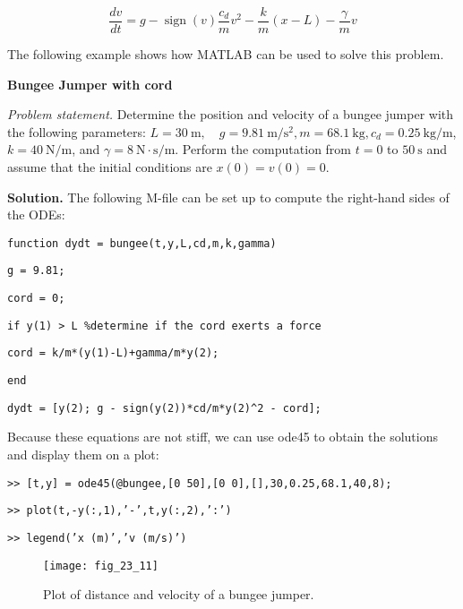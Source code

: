 \documentclass[../main.tex]{subfiles}
\begin{document}
\begin{equation}
    \tag{23.27b}
    \frac{d v}{d t}=g-\operatorname{sign}(v) \frac{c_{d}}{m} v^{2}-\frac{k}{m}(x-L)-\frac{\gamma}{m} v
\end{equation}

\noindent The following example shows how MATLAB can be used to solve this problem.

\begin{exmp}
    \textbf{Bungee Jumper with cord}

    \noindent \textit{Problem statement.} Determine the position and velocity of a bungee jumper with the following parameters: $L=30 \mathrm{~m}, \quad g=9.81 \mathrm{~m} / \mathrm{s}^{2}, m=68.1 \mathrm{~kg}, c_{d}=0.25 \mathrm{~kg} / \mathrm{m}$, $k=40 \mathrm{~N} / \mathrm{m}$, and $\gamma=8 \mathrm{~N} \cdot \mathrm{s} / \mathrm{m}$. Perform the computation from $t=0$ to $50 \mathrm{~s}$ and assume that the initial conditions are $x(0)=v(0)=0$.

    \noindent \textbf{Solution.} The following M-file can be set up to compute the right-hand sides of the ODEs: %

    \noindent \texttt{function dydt = bungee(t,y,L,cd,m,k,gamma)}

    \noindent \texttt{g = 9.81;}
    
    \noindent \texttt{cord = 0;}

    \noindent \texttt{if y(1) > L \%determine if the cord exerts a force}

    \texttt{cord = k/m*(y(1)-L)+gamma/m*y(2);}

    \noindent \texttt{end}

    \noindent \texttt{dydt = [y(2); g - sign(y(2))*cd/m*y(2)\^{}2 - cord];}

    Because these equations are not stiff, we can use ode45 to obtain the solutions and display them on a plot:

    \noindent \texttt{>> [t,y] = ode45(@bungee,[0 50],[0 0],[],30,0.25,68.1,40,8);}

    \noindent \texttt{>> plot(t,-y(:,1),'-',t,y(:,2),':')}

    \noindent \texttt{>> legend('x (m)','v (m/s)')}

    \begin{figure}[H]
        \centering
        \texttt{[image: fig\_23\_11]}
       \caption{\textsf{Plot of distance and velocity of a bungee jumper.}}\label{fig:fig_23_11}
    \end{figure}
\end{exmp}
\vspace{5mm}
\end{document}
